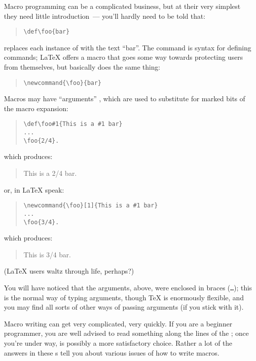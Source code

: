 Macro programming can be a complicated business, but at their very
simplest they need little introduction~--- you'll hardly need to be
told that:
\begin{quote}
\begin{verbatim}
\def\foo{bar}
\end{verbatim}
\end{quote}
replaces each instance of  with the text ``bar''.  The
command  is \plaintex{} syntax for defining commands;
\LaTeX{} offers a macro  that goes some way towards
protecting users from themselves, but basically does the same thing:
\begin{quote}
\begin{verbatim}
\newcommand{\foo}{bar}
\end{verbatim}
\end{quote}
Macros may have ``arguments'' , which are used to substitute for marked
bits of the macro expansion:
\begin{quote}
\begin{verbatim}
\def\foo#1{This is a #1 bar}
...
\foo{2/4}.
\end{verbatim}
\end{quote}
which produces:
\begin{quote}
  This is a 2/4 bar.
\end{quote}
or, in \LaTeX{} speak:
\begin{quote}
\begin{verbatim}
\newcommand{\foo}[1]{This is a #1 bar}
...
\foo{3/4}.
\end{verbatim}
\end{quote}
which produces:
\begin{quote}
  This is 3/4 bar.
\end{quote}
(\LaTeX{} users waltz through life, perhaps?)

You will have noticed that the arguments, above, were enclosed in
braces (\texttt{\obracesymbol{}\dots{}\cbracesymbol{}}); this is the
normal way of typing arguments, though \TeX{} is enormously flexible,
and you may find all sorts of other ways of passing arguments (if you
stick with it).

Macro writing can get very complicated, very quickly.  If you are a
beginner \AllTeX{} programmer, you are well advised to read something
along the lines of the ; once you're under
way,  is possibly a more satisfactory
choice.  Rather a lot of the answers in these s tell you
about various issues of how to write macros.

